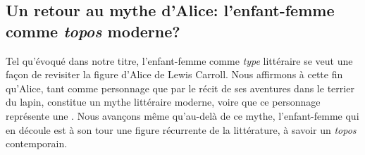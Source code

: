 \subsection{Un retour au mythe d'Alice: l'enfant-femme comme \textit{topos} moderne?}
Tel qu'évoqué dans notre titre, l'enfant-femme comme \textit{type} littéraire se veut une façon de revisiter la figure d'Alice de Lewis Carroll.
Nous affirmons à cette fin qu'Alice, tant comme personnage que par le récit de ses aventures dans le terrier du lapin, constitue un mythe littéraire moderne, voire que ce personnage représente une .
Nous avançons même qu'au-delà de ce mythe, l'enfant-femme qui en découle est à son tour une figure récurrente de la littérature, à savoir un \textit{topos} contemporain.

